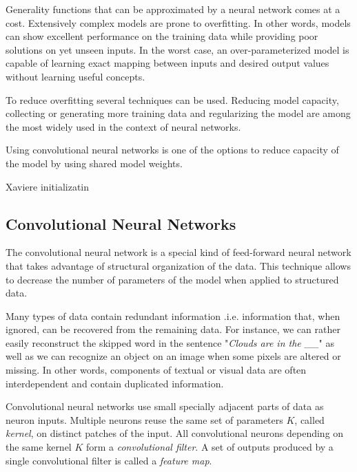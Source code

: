 Generality functions that can be approximated by a neural network comes at a cost.
Extensively complex models are prone to overfitting. In other words, models can show excellent performance on the training data while providing poor solutions on yet unseen inputs. In the worst case, an over-parameterized model is capable of learning exact mapping between inputs and desired output values without learning useful concepts.

To reduce overfitting several techniques can be used. Reducing model capacity, collecting or generating more training data and regularizing the model are among the most widely used in the context of neural networks.

Using convolutional neural networks is one of the options to reduce capacity of the model by using shared model weights.

Xaviere initializatin \cite{Glorot2010}



\subsection{Convolutional Neural Networks}
\label{ch:cnn}

The convolutional neural network is a special kind of feed-forward neural network that takes advantage of structural organization of the data. This technique allows to decrease the number of parameters of the model when applied to structured data.

Many types of data contain redundant information .i.e. information that, when ignored, can be recovered from the remaining data.
For instance, we can rather easily reconstruct the skipped word in the sentence "\textit{Clouds are in the \_\_}" as well as we can recognize an object on an image when some pixels are altered or missing.
In other words, components of textual or visual data are often interdependent and contain duplicated information.

Convolutional neural networks use small specially adjacent parts of data as neuron inputs. Multiple neurons reuse the same set of parameters $K$, called \textit{kernel}, on distinct patches of the input. All convolutional neurons depending on the same kernel $K$ form a \textit{convolutional filter}. A set of outputs produced by a single convolutional filter is called a \textit{feature map}.



